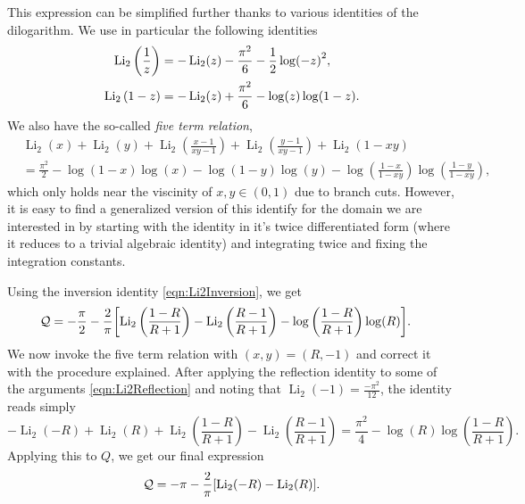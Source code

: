 \documentclass[11pt, a4paper]{article}
\newcommand{\Li}{\operatorname{Li}}
\numberwithin{equation}{section}
\begin{document}
This expression can be simplified further thanks to various identities of the dilogarithm. We use in particular the following identities \cite{zagier:dilogarithm}
\begin{align}
  \Li_2\qty(\frac{1}{z}) &= -\Li_2(z) - \frac{\pi^2}{6} - \frac{1}{2}\log(-z)^2, \label{eqn:Li2Inversion}\\
  \Li_2\qty(1-z) &= -\Li_2(z) + \frac{\pi^2}{6} - \log(z) \log(1-z). \label{eqn:Li2Reflection}
\end{align}
We also have the so-called \textit{five term relation},
\begin{equation}
  \begin{aligned}
    &\Li_2(x)+\Li_2(y)+\Li_2\left(\frac{x-1}{x y-1}\right)+\Li_2\left(\frac{y-1}{x y-1}\right)+\Li_2(1-x y) \\
    &= \frac{\pi ^2}{2} - \log (1-x) \log (x)- \log (1-y) \log (y) -\log \left(\frac{1-x}{1-x y}\right) \log \left(\frac{1-y}{1-x y}\right),
  \end{aligned}
\end{equation}
which only holds near the viscinity of $x, y \in (0, 1)$ due to branch cuts. However, it is easy to find a generalized version of this identify for the domain we are interested in by starting with the identity in it's twice differentiated form (where it reduces to a trivial algebraic identity) and integrating twice and fixing the integration constants.

Using the inversion identity \cref{eqn:Li2Inversion}, we get
\begin{equation}
  \begin{aligned}
  \mathcal{Q} &= -\frac{\pi}{2} -\frac{2}{\pi} \qty[\Li_2\left(\frac{1-R}{R+1}\right)- \Li_2\left(\frac{R-1}{R+1}\right) -  \log \left(\frac{1-R}{R+1}\right) \log (R)].
  \end{aligned}
\end{equation}
We now invoke the five term relation with $(x, y) = (R, -1)$ and correct it with the procedure explained. After applying the reflection identity to some of the arguments \cref{eqn:Li2Reflection} and noting that $\Li_2(-1) = \frac{-\pi^2}{12}$, the identity reads simply
\begin{equation}
  -\Li_2(-R)+\Li_2(R)+\Li_2\left(\frac{1-R}{R+1}\right)-\Li_2\left(\frac{R-1}{R+1}\right)
  = \frac{\pi ^2}{4}-\log (R) \log \left(\frac{1-R}{R+1}\right).
\end{equation}
Applying this to $Q$, we get our final expression
\begin{equation}
  \mathcal{Q} = - \pi - \frac{2}{\pi} \qty[\Li_2(-R)- \Li_2(R)].
\end{equation}
\end{document}
